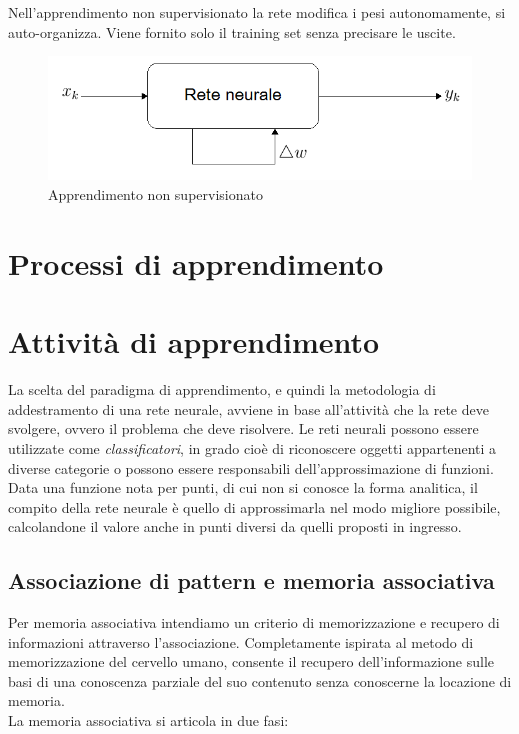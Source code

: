 \documentclass[12pt,a4paper,oneside]{book}
\begin{document}
		Nell'apprendimento non supervisionato la rete modifica i pesi autonomamente, si auto-organizza. Viene fornito solo il training set senza precisare le uscite.\\
	
		\begin{figure}[h]
			\centering
			\includegraphics[width=0.7\linewidth]{IMMAGINI/nonsupervisionato}
			\caption{ Apprendimento non supervisionato}
			\label{fig:nonsupervisionato}
		\end{figure}
	
	
	\section {Processi di apprendimento}
		
	\section{Attività di apprendimento}
		
		La scelta del paradigma di apprendimento, e quindi la metodologia di addestramento di una rete neurale, avviene in base all'attività che la rete deve svolgere, ovvero il problema che deve risolvere. Le reti neurali possono essere utilizzate come \emph{classificatori}, in grado cioè di riconoscere oggetti appartenenti a diverse categorie o possono essere responsabili dell'approssimazione di funzioni. Data una funzione nota per punti, di cui non si conosce la forma analitica, il compito della rete neurale è quello di approssimarla nel modo migliore possibile, calcolandone il valore anche in punti diversi da quelli proposti in ingresso.\\
		
		\subsection{Associazione di pattern e memoria associativa}
		
		Per memoria associativa intendiamo un criterio di memorizzazione e recupero di informazioni attraverso l'associazione. Completamente ispirata al metodo di memorizzazione del cervello umano, consente il recupero dell'informazione sulle basi di una conoscenza parziale del suo contenuto senza conoscerne la locazione di memoria.\\
		La memoria associativa si articola in due fasi:\\
		
\end{document}
